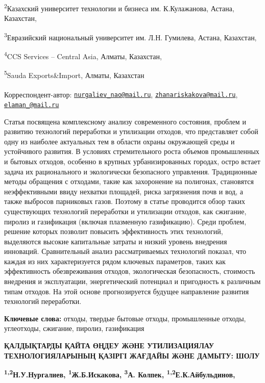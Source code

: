 \textsuperscript{2}Казахский университет технологии и бизнеса им.
К.Кулажанова, Астана, Казахстан,

\textsuperscript{3}Евразийский национальный университет им. Л.Н.
Гумилева, Астана, Казахстан,

\textsuperscript{4}CCS Services -- Central Asia, Алматы, Казахстан,

\textsuperscript{5}Sauda Exports\&Import, Алматы, Казахстан

{\bfseries \textsuperscript{\envelope }}Корреспондент-автор:
\href{mailto:nurgaliev_nao@mail.ru}{\nolinkurl{nurgaliev\_nao@mail.ru}},
\href{mailto:zhanariskakova@mail.ru}{\nolinkurl{zhanariskakova@mail.ru}},
\href{mailto:elaman_@mail.ru}{\nolinkurl{elaman\_@mail.ru}}

Статья посвящена комплексному анализу современного состояния, проблем и
развитию технологий переработки и утилизации отходов, что представляет
собой одну из наиболее актуальных тем в области охраны окружающей среды
и устойчивого развития. В условиях стремительного роста объемов
промышленных и бытовых отходов, особенно в крупных урбанизированных
городах, остро встает задача их рационального и экологически безопасного
управления. Традиционные методы обращения с отходами, такие как
захоронение на полигонах, становятся неэффективными ввиду нехватки
площадей, риска загрязнения почв и вод, а также выбросов парниковых
газов. Поэтому в статье проводится обзор таких существующих технологий
переработки и утилизации отходов, как сжигание, пиролиз и газификация
(включая плазменную газификацию). Среди проблем, решение которых
позволит повысить эффективность этих технологий, выделяются высокие
капитальные затраты и низкий уровень внедрения инноваций. Сравнительный
анализ рассматриваемых технологий показал, что каждая из них
характеризуется рядом ключевых параметров, таких как эффективность
обезвреживания отходов, экологическая безопасность, стоимость внедрения
и эксплуатации, энергетический потенциал и пригодность к различным типам
отходов. На этой основе прогнозируется будущее направление развития
технологий переработки.

{\bfseries Ключевые слова:} отходы, твердые бытовые отходы, промышленные
отходы, углеотходы, сжигание, пиролиз, газификация

{\bfseries ҚАЛДЫҚТАРДЫ ҚАЙТА ӨҢДЕУ ЖӘНЕ УТИЛИЗАЦИЯЛАУ ТЕХНОЛОГИЯЛАРЫНЫҢ
ҚАЗІРГІ ЖАҒДАЙЫ ЖӘНЕ ДАМЫТУ: ШОЛУ}

{\bfseries \textsuperscript{1,2}Н.У.Нургалиев\textsuperscript{\envelope },
\textsuperscript{1}Ж.Б.Искакова\textsuperscript{\envelope },
\textsuperscript{3}А. Колпек,
\textsuperscript{1,2}Е.К.Айбульдинов\textsuperscript{\envelope },}

